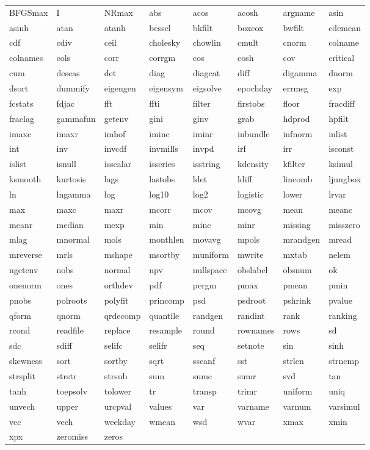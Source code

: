 \begin{tabular}{llllllll}
BFGSmax & I & NRmax & abs & acos & acosh & argname & asin \\
asinh & atan & atanh & bessel & bkfilt & boxcox & bwfilt & cdemean \\
cdf & cdiv & ceil & cholesky & chowlin & cmult & cnorm & colname \\
colnames & cols & corr & corrgm & cos & cosh & cov & critical \\
cum & deseas & det & diag & diagcat & diff & digamma & dnorm \\
dsort & dummify & eigengen & eigensym & eigsolve & epochday & errmsg & exp \\
fcstats & fdjac & fft & ffti & filter & firstobs & floor & fracdiff \\
fraclag & gammafun & getenv & gini & ginv & grab & hdprod & hpfilt \\
imaxc & imaxr & imhof & iminc & iminr & inbundle & infnorm & inlist \\
int & inv & invcdf & invmills & invpd & irf & irr & isconst \\
islist & isnull & isscalar & isseries & isstring & kdensity & kfilter & ksimul \\
ksmooth & kurtosis & lags & lastobs & ldet & ldiff & lincomb & ljungbox \\
ln & lngamma & log & log10 & log2 & logistic & lower & lrvar \\
max & maxc & maxr & mcorr & mcov & mcovg & mean & meanc \\
meanr & median & mexp & min & minc & minr & missing & misszero \\
mlag & mnormal & mols & monthlen & movavg & mpols & mrandgen & mread \\
mreverse & mrls & mshape & msortby & muniform & mwrite & mxtab & nelem \\
ngetenv & nobs & normal & npv & nullspace & obslabel & obsnum & ok \\
onenorm & ones & orthdev & pdf & pergm & pmax & pmean & pmin \\
pnobs & polroots & polyfit & princomp & psd & psdroot & pshrink & pvalue \\
qform & qnorm & qrdecomp & quantile & randgen & randint & rank & ranking \\
rcond & readfile & replace & resample & round & rownames & rows & sd \\
sdc & sdiff & selifc & selifr & seq & setnote & sin & sinh \\
skewness & sort & sortby & sqrt & sscanf & sst & strlen & strncmp \\
strsplit & strstr & strsub & sum & sumc & sumr & svd & tan \\
tanh & toepsolv & tolower & tr & transp & trimr & uniform & uniq \\
unvech & upper & urcpval & values & var & varname & varnum & varsimul \\
vec & vech & weekday & wmean & wsd & wvar & xmax & xmin \\
xpx & zeromiss & zeros & \\
\end{tabular}

